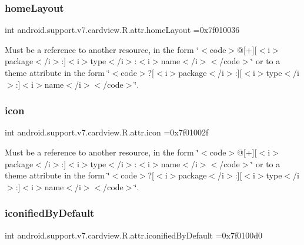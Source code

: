 \subsubsection{\texorpdfstring{home\+Layout}{homeLayout}}
{\footnotesize\ttfamily int android.\+support.\+v7.\+cardview.\+R.\+attr.\+home\+Layout =0x7f010036\hspace{0.3cm}{\ttfamily [static]}}

Must be a reference to another resource, in the form \char`\"{}$<$code$>$@\mbox{[}+\mbox{]}\mbox{[}$<$i$>$package$<$/i$>$\+:\mbox{]}$<$i$>$type$<$/i$>$\+:$<$i$>$name$<$/i$>$$<$/code$>$\char`\"{} or to a theme attribute in the form \char`\"{}$<$code$>$?\mbox{[}$<$i$>$package$<$/i$>$\+:\mbox{]}\mbox{[}$<$i$>$type$<$/i$>$\+:\mbox{]}$<$i$>$name$<$/i$>$$<$/code$>$\char`\"{}. \mbox{\label{classandroid_1_1support_1_1v7_1_1cardview_1_1R_1_1attr_a9d627427d4722257934c98eb559831e1}} 
\subsubsection{\texorpdfstring{icon}{icon}}
{\footnotesize\ttfamily int android.\+support.\+v7.\+cardview.\+R.\+attr.\+icon =0x7f01002f\hspace{0.3cm}{\ttfamily [static]}}

Must be a reference to another resource, in the form \char`\"{}$<$code$>$@\mbox{[}+\mbox{]}\mbox{[}$<$i$>$package$<$/i$>$\+:\mbox{]}$<$i$>$type$<$/i$>$\+:$<$i$>$name$<$/i$>$$<$/code$>$\char`\"{} or to a theme attribute in the form \char`\"{}$<$code$>$?\mbox{[}$<$i$>$package$<$/i$>$\+:\mbox{]}\mbox{[}$<$i$>$type$<$/i$>$\+:\mbox{]}$<$i$>$name$<$/i$>$$<$/code$>$\char`\"{}. \mbox{\label{classandroid_1_1support_1_1v7_1_1cardview_1_1R_1_1attr_ad2576cb78d3d6f4a5f43cedbd9214143}} 
\subsubsection{\texorpdfstring{iconified\+By\+Default}{iconifiedByDefault}}
{\footnotesize\ttfamily int android.\+support.\+v7.\+cardview.\+R.\+attr.\+iconified\+By\+Default =0x7f0100d0\hspace{0.3cm}{\ttfamily [static]}}

